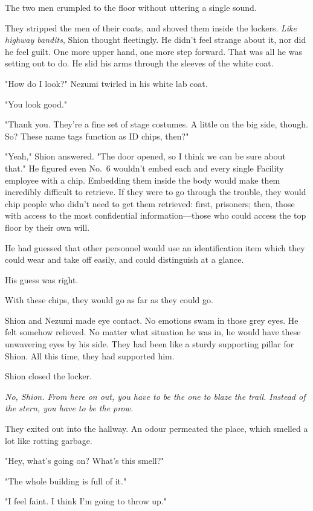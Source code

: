 The two men crumpled to the floor without uttering a single sound.

They stripped the men of their coats, and shoved them inside the
lockers. \emph{Like highway bandits}, Shion thought fleetingly. He didn't feel
strange about it, nor did he feel guilt. One more upper hand, one more
step forward. That was all he was setting out to do. He slid his arms
through the sleeves of the white coat.

"How do I look?" Nezumi twirled in his white lab coat.

"You look good."

"Thank you. They're a fine set of stage costumes. A little on the big
side, though. So? These name tags function as ID chips, then?"

"Yeah," Shion answered. "The door opened, so I think we can be sure
about that." He figured even No.~6 wouldn't embed each and every single
Facility employee with a chip. Embedding them inside the body would make
them incredibly difficult to retrieve. If they were to go through the
trouble, they would chip people who didn't need to get them retrieved:
first, prisoners; then, those with access to the most confidential
information---those who could access the top floor by their own will.

He had guessed that other personnel would use an identification item
which they could wear and take off easily, and could distinguish at a
glance.

His guess was right.

With these chips, they would go as far as they could go.

Shion and Nezumi made eye contact. No emotions swam in those grey eyes.
He felt somehow relieved. No matter what situation he was in, he would
have these unwavering eyes by his side. They had been like a sturdy
supporting pillar for Shion. All this time, they had supported him.

Shion closed the locker.

\emph{No, Shion. From here on out, you have to be the one to blaze the trail.
Instead of the stern, you have to be the prow.}

They exited out into the hallway. An odour permeated the place, which
smelled a lot like rotting garbage.

"Hey, what's going on? What's this smell?"

"The whole building is full of it."

"I feel faint. I think I'm going to throw up."

